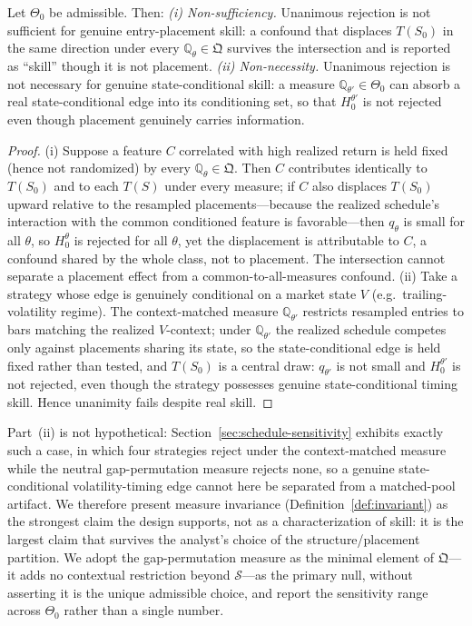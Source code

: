 \begin{proposition}
\label{prop:nonsuff}
Let $\Theta_0$ be admissible. Then:
\emph{(i) Non-sufficiency.} Unanimous rejection is not sufficient for genuine
entry-placement skill: a confound that displaces $T(S_0)$ in the same direction
under every $\mathbb{Q}_\theta\in\mathfrak Q$ survives the intersection and is
reported as ``skill'' though it is not placement.
\emph{(ii) Non-necessity.} Unanimous rejection is not necessary for genuine
state-conditional skill: a measure $\mathbb{Q}_{\theta'}\in\Theta_0$ can absorb a
real state-conditional edge into its conditioning set, so that $H_0^{\theta'}$ is
not rejected even though placement genuinely carries information.
\end{proposition}

\begin{proof}
(i) Suppose a feature $C$ correlated with high realized return is held fixed
(hence not randomized) by every $\mathbb{Q}_\theta\in\mathfrak Q$. Then $C$
contributes identically to $T(S_0)$ and to each $T(S)$ under every measure; if $C$
also displaces $T(S_0)$ upward relative to the resampled placements---because the
realized schedule's interaction with the common conditioned feature is
favorable---then $q_\theta$ is small for all $\theta$, so $H_0^\theta$ is rejected
for all $\theta$, yet the displacement is attributable to $C$, a confound shared
by the whole class, not to placement. The intersection cannot separate a
placement effect from a common-to-all-measures confound. (ii) Take a strategy
whose edge is genuinely conditional on a market state $V$ (e.g.\
trailing-volatility regime). The context-matched measure $\mathbb{Q}_{\theta'}$
restricts resampled entries to bars matching the realized $V$-context; under
$\mathbb{Q}_{\theta'}$ the realized schedule competes only against placements
sharing its state, so the state-conditional edge is held fixed rather than tested,
and $T(S_0)$ is a central draw: $q_{\theta'}$ is not small and $H_0^{\theta'}$ is
not rejected, even though the strategy possesses genuine state-conditional timing
skill. Hence unanimity fails despite real skill.
\end{proof}

Part~(ii) is not hypothetical: Section~\ref{sec:schedule-sensitivity} exhibits
exactly such a case, in which four strategies reject under the context-matched
measure while the neutral gap-permutation measure rejects none, so a genuine
state-conditional volatility-timing edge cannot here be separated from a
matched-pool artifact. We therefore present measure invariance
(Definition~\ref{def:invariant}) as the strongest claim the design supports, not
as a characterization of skill: it is the largest claim that survives the
analyst's choice of the structure/placement partition. We adopt the
gap-permutation measure as the minimal element of $\mathfrak Q$---it adds no
contextual restriction beyond $\mathcal S$---as the primary null, without
asserting it is the unique admissible choice, and report the sensitivity range
across $\Theta_0$ rather than a single number.
